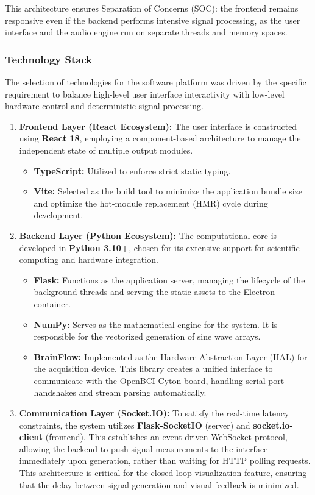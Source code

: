 \documentclass[../00_Main.tex]{subfiles}
\begin{document}
This architecture ensures Separation of Concerns (SOC): the frontend remains responsive even if the backend performs intensive signal processing, as the user interface and the audio engine run on separate threads and memory spaces.


\subsubsection{Technology Stack}
The selection of technologies for the software platform was driven by the specific requirement to balance high-level user interface interactivity with low-level hardware control and deterministic signal processing.

\begin{enumerate}
    \item\textbf{Frontend Layer (React Ecosystem):} The user interface is constructed using \textbf{React 18}, employing a component-based architecture to manage the independent state of multiple output modules.
    
    \begin{itemize}
        \item \textbf{TypeScript:} Utilized to enforce strict static typing.
        \item \textbf{Vite:} Selected as the build tool to minimize the application bundle size and optimize the hot-module replacement (HMR) cycle during development.
    \end{itemize}

    \item\textbf{Backend Layer (Python Ecosystem):} The computational core is developed in \textbf{Python 3.10+}, chosen for its extensive support for scientific computing and hardware integration.
    
    \begin{itemize}
        \item \textbf{Flask:} Functions as the application server, managing the lifecycle of the background threads and serving the static assets to the Electron container.
        \item \textbf{NumPy:} Serves as the mathematical engine for the system. It is responsible for the vectorized generation of sine wave arrays.
        \item \textbf{BrainFlow:} Implemented as the Hardware Abstraction Layer (HAL) for the acquisition device. This library creates a unified interface to communicate with the OpenBCI Cyton board, handling serial port handshakes and stream parsing automatically.
    \end{itemize}

    \item\textbf{Communication Layer (Socket.IO):} To satisfy the real-time latency constraints, the system utilizes \textbf{Flask-SocketIO} (server) and \textbf{socket.io-client} (frontend). This establishes an event-driven WebSocket protocol, allowing the backend to push signal measurements to the interface immediately upon generation, rather than waiting for HTTP polling requests. This architecture is critical for the closed-loop visualization feature, ensuring that the delay between signal generation and visual feedback is minimized.
\end{enumerate}
\end{document}
